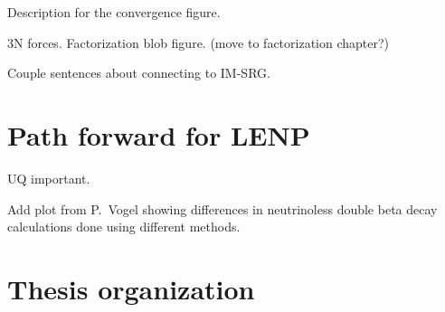 	Description for the convergence figure.

	3N forces.  Factorization blob figure. (move to factorization chapter?)

	Couple sentences about connecting to IM-SRG.



	\section{Path forward for LENP}

	UQ important.

	Add plot from P.\ Vogel showing differences in neutrinoless double beta decay
	calculations done using different methods.

	\section{Thesis organization}
